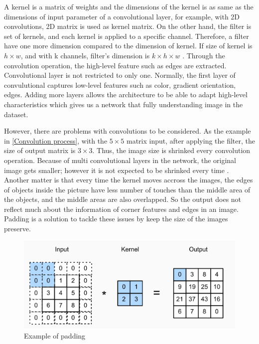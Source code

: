\documentclass[a4paper, 12pt]{article}
\begin{document}
A kernel is a matrix of weights and the dimensions of the kernel is as same as the dimensions of input parameter of a convolutional layer, for example, with 2D convolutions, 2D matrix is used as kernel matrix. On the other hand, the filter is set of kernels, and each kernel is applied to a specific channel. Therefore, a filter have one more dimension compared to the dimension of kernel. If size of kernel is $h \times w$, and with k channels, filter's dimension is $k \times h \times w$ \citep{albawi2017understanding}. Through the convolution operation, the high-level feature such as edges are extracted. Convolutional layer is not restricted to only one. Normally, the first layer of convulutional captures low-level features such as color, gradient orientation, edges. Adding more layers allows the architecture to be able to adapt high-level characteristics which gives us a network that fully understanding image in the dataset.

However, there are problems with convolutions to be considered. As the example in \ref*{Convolution process}, with the $5 \times 5$ matrix input, after applying the filter, the size of output matrix is $3 \times 3$. Thus, the image size is shrinked every convolution operation. Because of multi convolutional layers in the network, the original image gets smaller; however it is not expected to be shrinked every time \citep{szegedy2015going}. Another matter is that every time the kernel moves accross the images, the edges of objects inside the picture have less number of touches than the middle area of the objects, and the middle areas are also overlapped. So the output does not reflect much about the information of corner features and edges in an image. Padding is a solution to tackle these issues by keep the size of the images preserve.

\begin{figure}[H]
    \centering
    \includegraphics[width=\textwidth]{padding.png}
    \caption{Example of padding}
    \label{Padding}
\end{figure}
\end{document}
